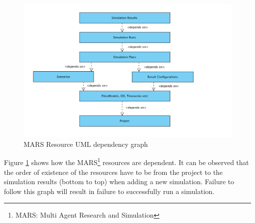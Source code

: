         \begin{figure}[H]
            \centering \includegraphics[scale=0.6]{grafiken/marsDependency.png}
            \caption{MARS Resource UML dependency graph \cite{DepDiagram}}
            \label{fig:marsDependency}
        \end{figure}
        
        Figure \ref{fig:marsDependency} shows how the MARS\footnote{MARS: Multi Agent Research and Simulation} 
        resources are dependent. It can be observed
        that the order of existence of the resources have to be from the project to the simulation results 
        (bottom to top) when adding a new simulation. Failure to follow this graph will result in failure to
        successfully run a simulation.

